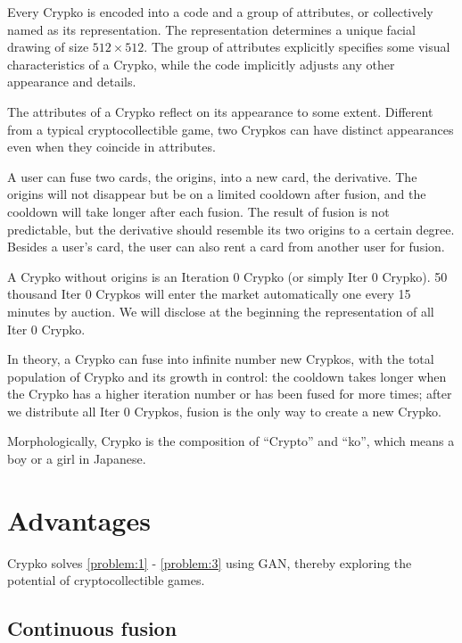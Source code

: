 \documentclass[b5paper]{article}
\begin{document}
Every Crypko is encoded into a code and a group of attributes, or collectively named as its representation. The representation determines a unique facial drawing of size $512 \times 512$. The group of attributes explicitly specifies some visual characteristics of a Crypko, while the code implicitly adjusts any other appearance and details.

The attributes of a Crypko reflect on its appearance to some extent. Different from a typical cryptocollectible game, two Crypkos can have distinct appearances even when they coincide in attributes.

A user can fuse two cards, the origins, into a new card, the derivative. The origins will not disappear but be on a limited cooldown after fusion, and the cooldown will take longer after each fusion. The result of fusion is not predictable, but the derivative should resemble its two origins to a certain degree. Besides a user's card, the user can also rent a card from another user for fusion.

A Crypko without origins is an Iteration 0 Crypko (or simply Iter 0 Crypko). 50 thousand Iter 0 Crypkos will enter the market automatically one every 15 minutes by auction. We will disclose at the beginning the representation of all Iter 0 Crypko.

In theory, a Crypko can fuse into infinite number new Crypkos, with the total population of Crypko and its growth in control: the cooldown takes longer when the Crypko has a higher iteration number or has been fused for more times; after we distribute all Iter 0 Crypkos, fusion is the only way to create a new Crypko.

Morphologically, Crypko is the composition of ``Crypto'' and ``ko'', which means a boy or a girl in Japanese.

\section{Advantages}

Crypko solves \ref{problem:1} - \ref{problem:3} using GAN, thereby exploring the potential of cryptocollectible games.

\subsection{Continuous fusion}
\end{document}
